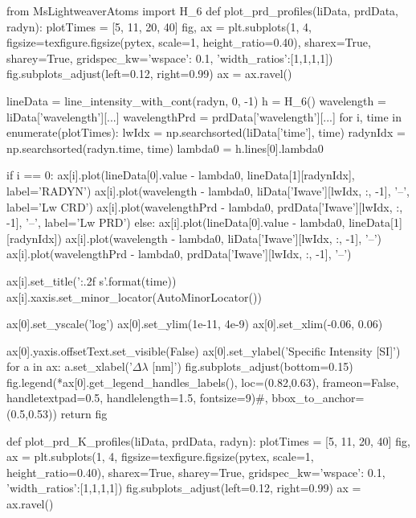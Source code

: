 \begin{pycode}[TimeDepRT]
from MsLightweaverAtoms import H_6
def plot_prd_profiles(liData, prdData, radyn):
    plotTimes = [5, 11, 20, 40]
    fig, ax = plt.subplots(1, 4, figsize=texfigure.figsize(pytex, scale=1, height_ratio=0.40),
                           sharex=True, sharey=True,
                           gridspec_kw={'wspace': 0.1, 'width_ratios':[1,1,1,1]})
    fig.subplots_adjust(left=0.12, right=0.99)
    ax = ax.ravel()

    lineData = line_intensity_with_cont(radyn, 0, -1)
    h = H_6()
    wavelength = liData['wavelength'][...]
    wavelengthPrd = prdData['wavelength'][...]
    for i, time in enumerate(plotTimes):
        lwIdx = np.searchsorted(liData['time'], time)
        radynIdx = np.searchsorted(radyn.time, time)
        lambda0 = h.lines[0].lambda0

        if i == 0:
            ax[i].plot(lineData[0].value - lambda0, lineData[1][radynIdx], label='RADYN')
            ax[i].plot(wavelength - lambda0, liData['Iwave'][lwIdx, :, -1], '--', label='Lw CRD')
            ax[i].plot(wavelengthPrd - lambda0, prdData['Iwave'][lwIdx, :, -1], '--', label='Lw PRD')
        else:
            ax[i].plot(lineData[0].value - lambda0, lineData[1][radynIdx])
            ax[i].plot(wavelength - lambda0, liData['Iwave'][lwIdx, :, -1], '--')
            ax[i].plot(wavelengthPrd - lambda0, prdData['Iwave'][lwIdx, :, -1], '--')

        ax[i].set_title('{:.2f} s'.format(time))
        ax[i].xaxis.set_minor_locator(AutoMinorLocator())

    ax[0].set_yscale('log')
    ax[0].set_ylim(1e-11, 4e-9)
    ax[0].set_xlim(-0.06, 0.06)

    ax[0].yaxis.offsetText.set_visible(False)
    ax[0].set_ylabel('Specific Intensity [SI]')
    for a in ax:
        a.set_xlabel('$\Delta\lambda$ [nm]')
    fig.subplots_adjust(bottom=0.15)
    fig.legend(*ax[0].get_legend_handles_labels(), loc=(0.82,0.63), frameon=False,
               handletextpad=0.5, handlelength=1.5, fontsize=9)#, bbox_to_anchor=(0.5,0.53))
    return fig

def plot_prd_K_profiles(liData, prdData, radyn):
    plotTimes = [5, 11, 20, 40]
    fig, ax = plt.subplots(1, 4, figsize=texfigure.figsize(pytex, scale=1, height_ratio=0.40),
                           sharex=True, sharey=True,
                           gridspec_kw={'wspace': 0.1, 'width_ratios':[1,1,1,1]})
    fig.subplots_adjust(left=0.12, right=0.99)
    ax = ax.ravel()


\end{pycode}
